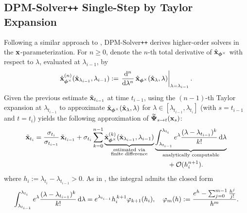 \subsection{DPM-Solver\texttt{++} Single-Step by Taylor Expansion}\label{subsec:dpm-solver++-single}
Following a similar approach to , DPM-Solver\texttt{++} derives higher-order solvers in the ${\mathbf{x}}$-parameterization. For $n \ge 0$, denote the $n$-th total derivative of $\hat{{\mathbf{x}}}_{{\bm{\phi}}^\times}$ with respect to $\lambda$, evaluated at $\lambda_{i-1}$, by
\[
\hat{{\mathbf{x}}}_{{\bm{\phi}}^\times}^{(n)}(\hat{{\mathbf{x}}}_{\lambda_{i-1}}, \lambda_{i-1})
:= \left.\frac{\mathop{}\!\mathrm{d}^{n}}{\mathop{}\!\mathrm{d} \lambda^{n}}\,
\hat{{\mathbf{x}}}_{{\bm{\phi}}^\times}(\hat{{\mathbf{x}}}_\lambda, \lambda)\right|_{\lambda=\lambda_{i-1}}.
\]
Given the previous estimate $\tilde{{\mathbf{x}}}_{t_{i-1}}$ at time $t_{i-1}$, using the $(n-1)$-th Taylor expansion at $\lambda_{t_{i-1}}$ to approximate $\hat{{\mathbf{x}}}_{\bm{\phi}^\times}(\hat{{\mathbf{x}}}_\lambda, \lambda)$ for $\lambda \in [\lambda_{t_{i-1}},\lambda_{t_i}]$ (with $s=t_{i-1}$ and $t=t_i$) yields the following approximation of $\widetilde{{\bm{\Psi}}}_{s\to t}({\mathbf{x}}_s)$:
\begin{align*} 
\tilde{{\mathbf{x}}}_{t_i} = \frac{\sigma_{t_i}}{\sigma_{t_{i-1}}}\,\tilde{{\mathbf{x}}}_{t_{i-1}} + \sigma_{t_i} \sum_{k=0}^{n-1} \underbrace{\hat{{\mathbf{x}}}_{{\bm{\phi}}^\times}^{(k)}(\hat{{\mathbf{x}}}_{\lambda_{i-1}}, \lambda_{i-1})}_{\substack{\text{estimated via} \\ \text{finite difference}}} &\underbrace{\int_{\lambda_{t_{i-1}}}^{\lambda_{t_{i}}}e^\lambda \frac{(\lambda - \lambda_{t_{i-1}})^k}{k!} \mathop{}\!\mathrm{d} \lambda}_{\mathrm{analytically\,\,computable}} 
\\ &\quad\quad+ \mathcal O(h_i^{n+1}). 
\end{align*}
where $h_i:=\lambda_{t_i}-\lambda_{t_{i-1}}>0$. As in , the integral admits the closed form
\[
\int_{\lambda_{t_{i-1}}}^{\lambda_{t_i}}
e^\lambda \frac{(\lambda-\lambda_{t_{i-1}})^k}{k!} \mathop{}\!\mathrm{d}\lambda
=
e^{\lambda_{t_{i-1}}} h_i^{\,k+1} \varphi_{k+1}(h_i),
\quad
\varphi_{m}(h):=\frac{e^{h}-\sum_{j=0}^{m-1} \frac{h^{j}}{j!}}{h^{m}}.
\]

